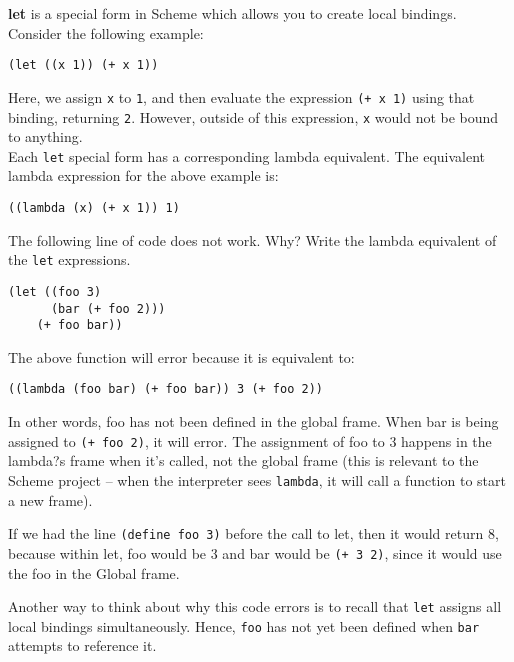 \begin{blocksection}
\textbf{let} is a special form in Scheme which allows you to create local bindings. Consider the following example:
\newline
\begin{lstlisting}
(let ((x 1)) (+ x 1))
\end{lstlisting}
Here, we assign \texttt{x} to \texttt{1}, and then evaluate the expression \texttt{(+ x 1)} using that binding, returning \texttt{2}. However, outside of this expression, \texttt{x} would not be bound to anything. \\
Each \texttt{let} special form has a corresponding lambda equivalent. The equivalent lambda expression for the above example is: 
\begin{lstlisting}
((lambda (x) (+ x 1)) 1)
\end{lstlisting}
\question
The following line of code does not work. Why? Write the lambda
equivalent of the \texttt{let} expressions.

\begin{lstlisting}
(let ((foo 3)
      (bar (+ foo 2)))
    (+ foo bar))
\end{lstlisting}
\end{blocksection}
\begin{blocksection}
\begin{solution}
The above function will error because it is equivalent to:
\begin{lstlisting}
((lambda (foo bar) (+ foo bar)) 3 (+ foo 2))
\end{lstlisting}

In other words, foo has not been defined in the global frame. When bar is being
assigned to \texttt{(+ foo 2)}, it will error. The assignment of foo to 3
happens in the lambda?s frame when it's called, not the global frame (this is
relevant to the Scheme project -- when the interpreter sees \texttt{lambda}, it
will call a function to start a new frame).

If we had the line \texttt{(define foo 3)} before the call to let, then it would
return 8, because within let, foo would be 3 and bar would be \texttt{(+ 3 2)},
since it would use the foo in the Global frame.

Another way to think about why this code errors is to recall that \texttt{let} assigns all local bindings simultaneously. Hence, \texttt{foo} has not yet been defined when \texttt{bar} attempts to reference it.
\end{solution}
\end{blocksection}
